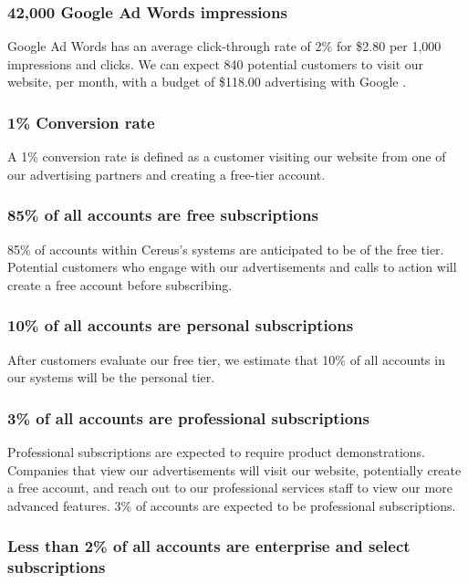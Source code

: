 \subsubsection*{42,000 Google Ad Words impressions}

Google Ad Words has an average click-through rate of 2\% for \$2.80 per 1,000 impressions and clicks. We can expect 840 potential customers to visit our website, per month, with a budget of \$118.00 advertising with Google \cite{adstag.2020}.

\subsubsection*{1\% Conversion rate}

A 1\% conversion rate is defined as a customer visiting our website from one of our advertising partners and creating a free-tier account.

\subsubsection*{85\% of all accounts are free subscriptions}

85\% of accounts within Cereus's systems are anticipated to be of the free tier. Potential customers who engage with our advertisements and calls to action will create a free account before subscribing.

\subsubsection*{10\% of all accounts are personal subscriptions}

After customers evaluate our free tier, we estimate that 10\% of all accounts in our systems will be the personal tier.

\subsubsection*{3\% of all accounts are professional subscriptions}

Professional subscriptions are expected to require product demonstrations. Companies that view our advertisements will visit our website, potentially create a free account, and reach out to our professional services staff to view our more advanced features. 3\% of accounts are expected to be professional subscriptions. 

\subsubsection*{Less than 2\% of all accounts are enterprise and select subscriptions}


